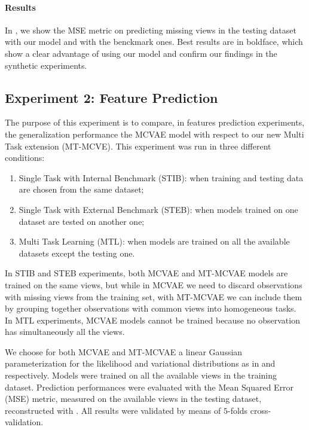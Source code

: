 \paragraph{Results}
In , we show the MSE metric on predicting missing views in the testing dataset with our model and with the benckmark ones.
Best results are in boldface, which show a clear advantage of using our model and confirm our findings in the synthetic experiments.

\subsection{Experiment 2: Feature Prediction}
\label{ssec:feats}

The purpose of this experiment is to compare, in features prediction experiments, the generalization performance the MCVAE model with respect to our new Multi Task extension (MT-MCVE).
This experiment was run in three different conditions:
%
\begin{enumerate}
\item Single Task with Internal Benchmark (STIB): when training and testing data are chosen from the same dataset;
%
\item Single Task with External Benchmark (STEB): when models trained on one dataset are tested on another one;
%
\item Multi Task Learning (MTL): when models are trained on all the available datasets except the testing one.
%
\end{enumerate}
%
In STIB and STEB experiments, both MCVAE and MT-MCVAE models are trained on the same views,
but while in MCVAE we need to discard observations with missing views from the training set,
with MT-MCVAE we can include them by grouping together observations with common views into homogeneous tasks.
In MTL experiments, MCVAE models cannot be trained because no observation has simultaneously all the views.

We choose for both MCVAE and MT-MCVAE a linear Gaussian parameterization for the likelihood and variational distributions as in  and  respectively.
Models were trained on all the available views in the training dataset. %
Prediction performances were evaluated with the Mean Squared Error (MSE) metric, measured on the available views in the testing dataset, reconstructed with .
All results were validated by means of $5$-folds cross-validation.

